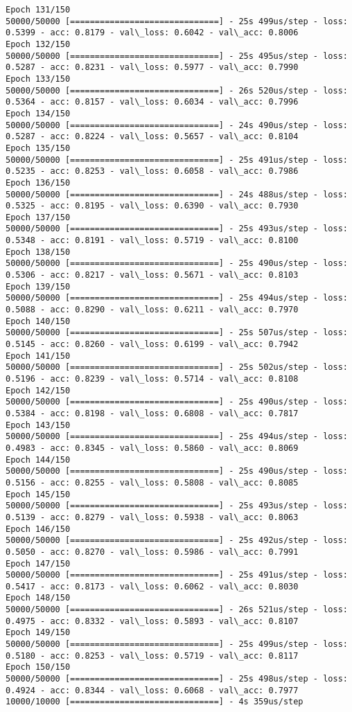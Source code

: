 \documentclass[11pt]{article}
\begin{document}
\begin{Verbatim}[commandchars=\\\{\}]
Epoch 131/150
50000/50000 [==============================] - 25s 499us/step - loss: 0.5399 - acc: 0.8179 - val\_loss: 0.6042 - val\_acc: 0.8006
Epoch 132/150
50000/50000 [==============================] - 25s 495us/step - loss: 0.5287 - acc: 0.8231 - val\_loss: 0.5977 - val\_acc: 0.7990
Epoch 133/150
50000/50000 [==============================] - 26s 520us/step - loss: 0.5364 - acc: 0.8157 - val\_loss: 0.6034 - val\_acc: 0.7996
Epoch 134/150
50000/50000 [==============================] - 24s 490us/step - loss: 0.5287 - acc: 0.8224 - val\_loss: 0.5657 - val\_acc: 0.8104
Epoch 135/150
50000/50000 [==============================] - 25s 491us/step - loss: 0.5235 - acc: 0.8253 - val\_loss: 0.6058 - val\_acc: 0.7986
Epoch 136/150
50000/50000 [==============================] - 24s 488us/step - loss: 0.5325 - acc: 0.8195 - val\_loss: 0.6390 - val\_acc: 0.7930
Epoch 137/150
50000/50000 [==============================] - 25s 493us/step - loss: 0.5348 - acc: 0.8191 - val\_loss: 0.5719 - val\_acc: 0.8100
Epoch 138/150
50000/50000 [==============================] - 25s 490us/step - loss: 0.5306 - acc: 0.8217 - val\_loss: 0.5671 - val\_acc: 0.8103
Epoch 139/150
50000/50000 [==============================] - 25s 494us/step - loss: 0.5088 - acc: 0.8290 - val\_loss: 0.6211 - val\_acc: 0.7970
Epoch 140/150
50000/50000 [==============================] - 25s 507us/step - loss: 0.5145 - acc: 0.8260 - val\_loss: 0.6199 - val\_acc: 0.7942
Epoch 141/150
50000/50000 [==============================] - 25s 502us/step - loss: 0.5196 - acc: 0.8239 - val\_loss: 0.5714 - val\_acc: 0.8108
Epoch 142/150
50000/50000 [==============================] - 25s 490us/step - loss: 0.5384 - acc: 0.8198 - val\_loss: 0.6808 - val\_acc: 0.7817
Epoch 143/150
50000/50000 [==============================] - 25s 494us/step - loss: 0.4983 - acc: 0.8345 - val\_loss: 0.5860 - val\_acc: 0.8069
Epoch 144/150
50000/50000 [==============================] - 25s 490us/step - loss: 0.5156 - acc: 0.8255 - val\_loss: 0.5808 - val\_acc: 0.8085
Epoch 145/150
50000/50000 [==============================] - 25s 493us/step - loss: 0.5139 - acc: 0.8279 - val\_loss: 0.5938 - val\_acc: 0.8063
Epoch 146/150
50000/50000 [==============================] - 25s 492us/step - loss: 0.5050 - acc: 0.8270 - val\_loss: 0.5986 - val\_acc: 0.7991
Epoch 147/150
50000/50000 [==============================] - 25s 491us/step - loss: 0.5417 - acc: 0.8173 - val\_loss: 0.6062 - val\_acc: 0.8030
Epoch 148/150
50000/50000 [==============================] - 26s 521us/step - loss: 0.4975 - acc: 0.8332 - val\_loss: 0.5893 - val\_acc: 0.8107
Epoch 149/150
50000/50000 [==============================] - 25s 499us/step - loss: 0.5180 - acc: 0.8253 - val\_loss: 0.5719 - val\_acc: 0.8117
Epoch 150/150
50000/50000 [==============================] - 25s 498us/step - loss: 0.4924 - acc: 0.8344 - val\_loss: 0.6068 - val\_acc: 0.7977
10000/10000 [==============================] - 4s 359us/step

    \end{Verbatim}
\end{document}
